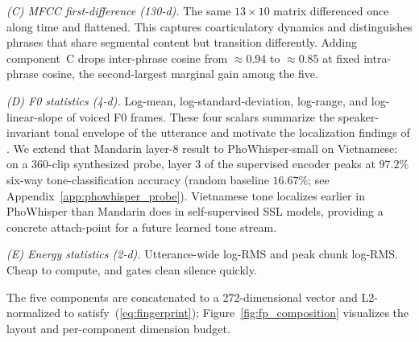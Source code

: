 \documentclass[a4paper,fleqn]{cas-dc}
\begin{document}
\emph{(C) MFCC first-difference (130-d).} The same $13 \times 10$ matrix differenced once along time and flattened. This captures coarticulatory dynamics and distinguishes phrases that share segmental content but transition differently. Adding component~C drops inter-phrase cosine from $\approx 0.94$ to $\approx 0.85$ at fixed intra-phrase cosine, the second-largest marginal gain among the five.

\emph{(D) F0 statistics (4-d).} Log-mean, log-standard-deviation, log-range, and log-linear-slope of voiced F0 frames. These four scalars summarize the speaker-invariant tonal envelope of the utterance and motivate the localization findings of \citet{delafuente2024tone}. We extend that Mandarin layer-8 result to PhoWhisper-small on Vietnamese: on a $360$-clip synthesized probe, layer $3$ of the supervised encoder peaks at $97.2\%$ six-way tone-classification accuracy (random baseline $16.67\%$; see Appendix~\ref{app:phowhisper_probe}). Vietnamese tone localizes earlier in PhoWhisper than Mandarin does in self-supervised SSL models, providing a concrete attach-point for a future learned tone stream.

\emph{(E) Energy statistics (2-d).} Utterance-wide log-RMS and peak chunk log-RMS. Cheap to compute, and gates clean silence quickly.

The five components are concatenated to a 272-dimensional vector and L2-normalized to satisfy~(\ref{eq:fingerprint}); Figure~\ref{fig:fp_composition} visualizes the layout and per-component dimension budget.
\end{document}
